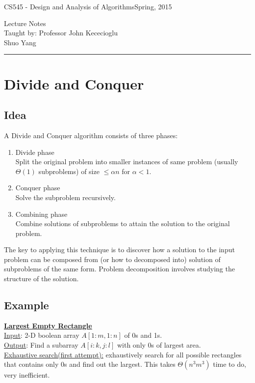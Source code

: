 \documentclass[11pt]{article}
\def\CourseCode{CS545 - Design and Analysis of Algorithms}
\def\DateHandedOut{Spring, 2015}
\def\Professor{John Kececioglu}
\def\Author{Shuo Yang}
\begin{document}
\noindent

\CourseCode \hfill \DateHandedOut

\begin{center}
Lecture Notes\\
Taught by: Professor \Professor\\
\Author\\
\end{center}

\hrule\smallskip

\section{Divide and Conquer}
\subsection{Idea}
A Divide and Conquer algorithm consists of three phases:
\begin{enumerate}
\item Divide phase\\
Split the original problem into smaller instances of same problem
(usually $\Theta(1)$ subproblems) of size $\leq \alpha n$ for $\alpha
< 1$.
\item Conquer phase\\
Solve the subproblem recursively.
\item Combining phase\\
Combine solutions of subproblems to attain the solution to the
original problem.
\end{enumerate}

The key to applying this technique is to discover how a solution to
the input problem can be composed from (or how to decomposed into)
solution of subproblems of the same form. Problem decomposition
involves studying the structure of the solution. 

\subsection{Example}
\underline{\textbf{Largest Empty Rectangle}}\\

\underline{Input}: 2-D boolean array $A[1:m, 1:n]$ of 0s
and 1s.\\

\underline{Output}: Find a subarray $A[i:k, j:l]$ with only 0s of
largest area.\\

\underline{Exhaustive search(first attempt):} exhaustively search for
all possible rectangles that contains only 0s and find out the
largest. This takes $\Theta(n^3m^3)$ time to do, very inefficient.\\
\end{document}
